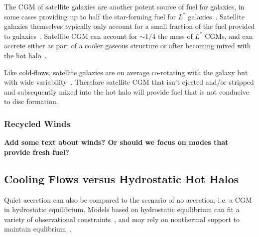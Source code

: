 \documentclass[fleqn,usenatbib]{mnras}
\begin{document}
The CGM of satellite galaxies are another potent source of fuel for galaxies, in some cases providing up to half the star-forming fuel for $L^*$ galaxies~\citep[intergalactic transfer; ][]{Angles-Alcazar2017}.
Satellite galaxies themselves typically only account for a small fraction of the fuel provided to galaxies~\citep{Angles-Alcazar2017}. 
Satellite CGM can account for $\sim1/4$ the mass of $L^*$ CGMs, and can accrete either as part of a cooler gaseous structure or after becoming mixed with the hot halo~\citep{Hafen2019, Hafen2020}.

Like cold-flows, satellite galaxies are on average co-rotating with the galaxy but with wide variability~\citep[e.g.][]{Stewart2011, Hafen2019}.
Therefore satellite CGM that isn't ejected and/or stripped and subsequently mixed into the hot halo will provide fuel that is not conducive to disc formation.

\subsubsection{Recycled Winds}
\label{s: modes -- winds}

\textbf{
Add some text about winds?
Or should we focus on modes that provide fresh fuel?
}


\subsection{Cooling Flows versus Hydrostatic Hot Halos}
\label{s: modes -- hydrostatic}

Quiet accretion can also be compared to the scenario of no accretion, i.e. a CGM in hydrostatic equilibrium.
Models based on hydrostatic equilibrium can fit a variety of observational constraints~\citep[e.g.][]{Faerman2017, Krause2019}, and may rely on nonthermal support to maintain equlibrium~\citep[e.g.][]{Faerman2019}.
\end{document}
